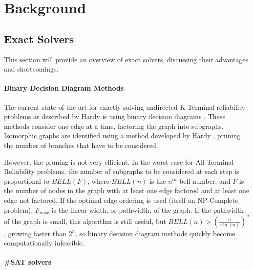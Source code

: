 \hypertarget{background}{%
\section{Background}\label{background}}

\hypertarget{exact-solvers}{%
\subsection{Exact Solvers}\label{exact-solvers}}

This section will provide an overview of exact solvers, discussing their advantages and shortcomings.

\hypertarget{binary-decision-diagram-methods}{%
\paragraph{\texorpdfstring{Binary Decision Diagram Methods\\
}{Binary Decision Diagram Methods }}\label{binary-decision-diagram-methods}}

The current state-of-the-art for exactly solving undirected K-Terminal reliability problems as described by Hardy is using binary decision diagrams \cite{hardy2007k}. These methods consider one edge at a time, factoring the graph into subgraphs. Isomorphic graphs are identified using a method developed by Hardy \cite{carlier1996decomposition}, pruning the number of branches that have to be considered.

However, the pruning is not very efficient. In the worst case for All Terminal Reliability problems, the number of subgraphs to be considered at each step is proportional to \(BELL(F)\), where \(BELL(n)\) is the \(n^{th}\) bell number, and \(F\) is the number of nodes in the graph with at least one edge factored and at least one edge not factored. If the optimal edge ordering is used (itself an NP-Complete problem), \(F_{max}\) is the linear-width, or pathwidth, of the graph. If the pathwidth of the graph is small, this algorithm is still useful, but \(BELL(n)>(\frac{n}{e\ln(n)})^n\) \cite{berend2010improved}, growing faster than \(2^n\), so binary decision diagram methods quickly become computationally infeasible.

\hypertarget{sat-solvers}{%
\paragraph{\texorpdfstring{\#SAT solvers\\
}{\#SAT solvers }}\label{sat-solvers}}

